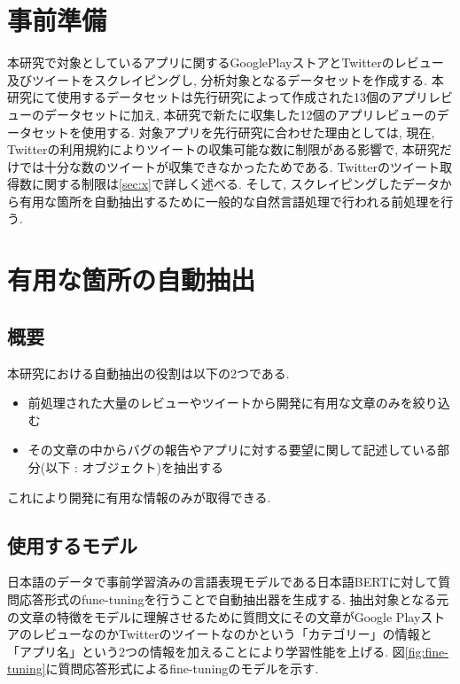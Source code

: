 \section{事前準備}
本研究で対象としているアプリに関するGooglePlayストアとTwitterのレビュー及びツイートをスクレイピングし, 分析対象となるデータセットを作成する. 本研究にて使用するデータセットは先行研究によって作成された13個のアプリレビューのデータセットに加え, 本研究で新たに収集した12個のアプリレビューのデータセットを使用する. 
対象アプリを先行研究に合わせた理由としては, 現在, Twitterの利用規約によりツイートの収集可能な数に制限がある影響で, 本研究だけでは十分な数のツイートが収集できなかったためである. Twitterのツイート取得数に関する制限は\ref{sec:x}で詳しく述べる. 
そして, スクレイピングしたデータから有用な箇所を自動抽出するために一般的な自然言語処理で行われる前処理を行う. 


\section{有用な箇所の自動抽出}
\subsection{概要}
本研究における自動抽出の役割は以下の2つである. 
\begin{itemize}
  \item 前処理された大量のレビューやツイートから開発に有用な文章のみを絞り込む
  \item その文章の中からバグの報告やアプリに対する要望に関して記述している部分(以下 : オブジェクト)を抽出する
\end{itemize}
これにより開発に有用な情報のみが取得できる. 

\subsection{使用するモデル}
日本語のデータで事前学習済みの言語表現モデルである日本語BERTに対して質問応答形式のfune-tuningを行うことで自動抽出器を生成する. 
抽出対象となる元の文章の特徴をモデルに理解させるために質問文にその文章がGoogle PlayストアのレビューなのかTwitterのツイートなのかという「カテゴリー」の情報と「アプリ名」という2つの情報を加えることにより学習性能を上げる. 
図\ref{fig:fine-tuning}に質問応答形式によるfine-tuningのモデルを示す. 

